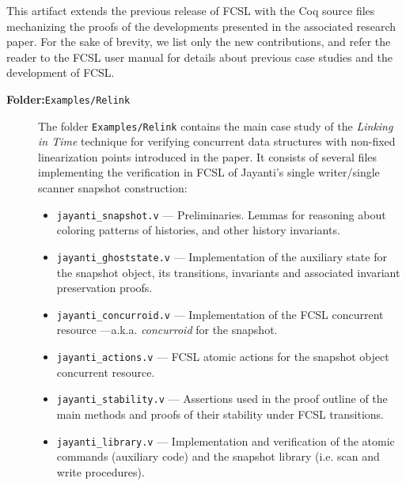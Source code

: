 \documentclass[a4paper,USenglish]{darts}
\begin{document}
\begin{content}

  This artifact extends the previous release of FCSL with the Coq
  source files mechanizing the proofs of the developments presented in
  the associated research paper. For the sake of brevity, we list only
  the new contributions, and refer the reader to the FCSL user manual
  for details about previous case studies and the development of FCSL.

\begin{description}
  
\item [{\bf \large Folder:}\texttt{Examples/Relink}] The folder
  \texttt{Examples/Relink} contains the main case study of the {\it
    Linking in Time} technique for verifying concurrent data
  structures with non-fixed linearization points introduced in the
  paper. It consists of several files implementing the verification in
  FCSL of Jayanti's single writer/single scanner snapshot
  construction:

\begin{itemize}

 \item \texttt{jayanti\_snapshot.v} --- Preliminaries. Lemmas for
       reasoning about coloring patterns of histories, and other
       history invariants.

 \item \texttt{jayanti\_ghoststate.v} --- Implementation of the
 auxiliary state for the snapshot object, its transitions, invariants
 and associated invariant preservation proofs.

 \item \texttt{jayanti\_concurroid.v} --- Implementation of the FCSL
 concurrent resource ---a.k.a. {\it concurroid} for the snapshot.

 \item \texttt{jayanti\_actions.v} --- FCSL atomic actions for the
 snapshot object concurrent resource.

 \item \texttt{jayanti\_stability.v} --- Assertions used in the proof
 outline of the main methods and proofs of their stability under FCSL
 transitions.

 \item \texttt{jayanti\_library.v} --- Implementation and verification
 of the atomic commands (auxiliary code) and the snapshot library
 (i.e. scan and write procedures).


\end{itemize}
\end{description}
\end{content}
\end{document}
